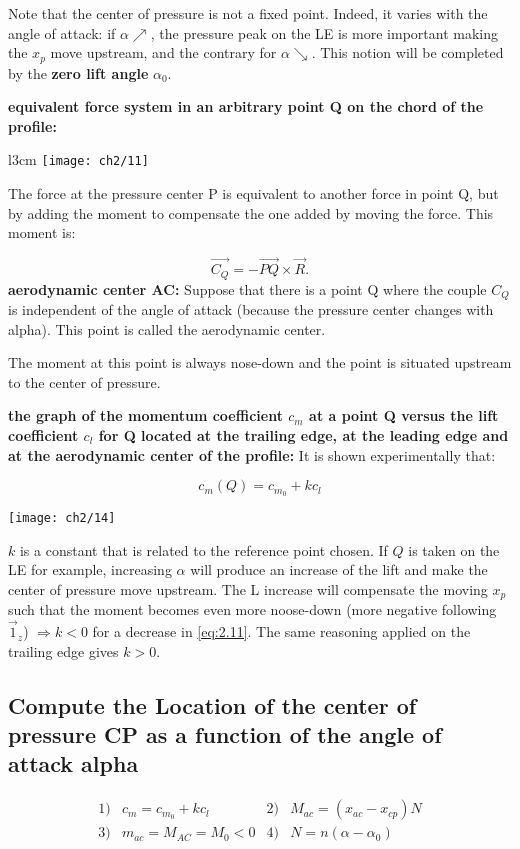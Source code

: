 \documentclass[british,french,11pt, a4paper, openany]{article}
\begin{document}
Note that the center of pressure is not a fixed point. Indeed, it varies with the angle of attack: if $\alpha \nearrow$, the pressure peak on the LE is more important making the $x_p$ move upstream, and the contrary for $\alpha \searrow$. This notion will be completed by the \textbf{zero lift angle} $\alpha _{0}$.

\textbf{equivalent force system in an arbitrary point Q on the chord of the profile:} 
\begin{wrapfigure}[7]{l}{3cm}
	\vspace{-5mm}
	\texttt{[image: ch2/11]}
\end{wrapfigure}
The force at the pressure center P is equivalent to another force in point Q, but by adding the moment to compensate the one added by moving the force. This moment is:

\begin{equation}
\vec{C_Q} = -\vec{PQ}\times \vec{R}.
\end{equation}
\textbf{aerodynamic center AC:} Suppose that there is a point Q where the couple $C_Q$ is independent of the angle of attack (because the pressure center changes with alpha). This point is called the aerodynamic center.

The moment at this point is always nose-down and the point is situated upstream to the center of pressure.

\textbf{the graph of the momentum coefficient $c_m$ at a point Q versus the
	lift coefficient $c_l$ for Q located at the trailing edge, at the leading edge and at
	the aerodynamic center of the profile:} It is shown experimentally that:

\begin{equation}
c_m(Q) = c_{m_0} + k c_l
\label{eq:2.11}
\end{equation}

\begin{center}
	\texttt{[image: ch2/14]}
\end{center}
$k$ is a constant that is related to the reference point chosen. If $Q$ is taken on the LE for example, increasing $\alpha$ will produce an increase of the lift and make the center of pressure move upstream. The L increase will compensate the moving $x_p$ such that the moment becomes even more noose-down (more negative following $\vec{1}_z$) $\Rightarrow k<0$ for a decrease in \eqref{eq:2.11}. The same reasoning applied on the trailing edge gives $k>0$. 
\subsection{Compute the Location of the center of pressure CP as a function of the angle of	attack alpha}
\begin{equation}
\begin{array}{cccc}
1) & c_m = c_{m_0} + kc_l & 2)& M_{ac} = (x_{ac}-x_{cp})N \\
3) & m_{ac} = M_{AC} = M_0 <0 & 4) & N = n(\alpha-\alpha _0)
\end{array}
\end{equation}
\end{document}
